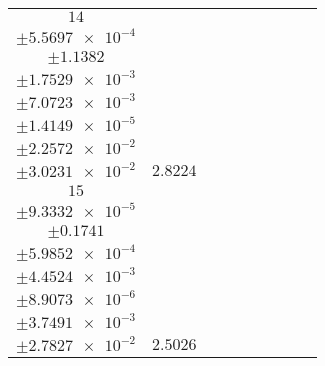 \documentclass[8pt]{article}
\begin{document}
\begin{longtable}[l]{c c c c c c c c c}
$\num{14}$ & \begin{tabular}[c]{@{}c@{}}$\num{3.5088e-2}$ \\ $\pm\num{5.5697e-4}$\end{tabular} & \begin{tabular}[c]{@{}c@{}}$\num{-1.074}$ \\ $\pm\num{1.1382}$\end{tabular} & \begin{tabular}[c]{@{}c@{}}$\num{-6.8164}$ \\ $\pm\num{1.7529e-3}$\end{tabular} & \begin{tabular}[c]{@{}c@{}}$\num{1.6026e+3}$ \\ $\pm\num{7.0723e-3}$\end{tabular} & \begin{tabular}[c]{@{}c@{}}$\num{3.206}$ \\ $\pm\num{1.4149e-5}$\end{tabular} & \begin{tabular}[c]{@{}c@{}}$\num{1.2705}$ \\ $\pm\num{2.2572e-2}$\end{tabular} & \begin{tabular}[c]{@{}c@{}}$\num{4.13}$ \\ $\pm\num{3.0231e-2}$\end{tabular} & $\num{2.8224}$\\
$\num{15}$ & \begin{tabular}[c]{@{}c@{}}$\num{3.1007e-2}$ \\ $\pm\num{9.3332e-5}$\end{tabular} & \begin{tabular}[c]{@{}c@{}}$\num{-0.67683}$ \\ $\pm\num{0.1741}$\end{tabular} & \begin{tabular}[c]{@{}c@{}}$\num{-2.5866}$ \\ $\pm\num{5.9852e-4}$\end{tabular} & \begin{tabular}[c]{@{}c@{}}$\num{1.6068e+3}$ \\ $\pm\num{4.4524e-3}$\end{tabular} & \begin{tabular}[c]{@{}c@{}}$\num{3.2144}$ \\ $\pm\num{8.9073e-6}$\end{tabular} & \begin{tabular}[c]{@{}c@{}}$\num{1.1737}$ \\ $\pm\num{3.7491e-3}$\end{tabular} & \begin{tabular}[c]{@{}c@{}}$\num{4.2383}$ \\ $\pm\num{2.7827e-2}$\end{tabular} & $\num{2.5026}$\\

\end{longtable}
\end{document}
